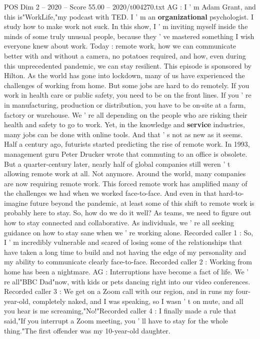 \begin{textsample}{POS Dim 2 – 2020 – Score 55.00 – 2020/t004270.txt}
AG : I ' m Adam Grant, and this is"WorkLife,"my podcast with TED.
I ' m an \textbf{organizational} psychologist.
I study how to make work not suck.
In this show, I ' m inviting myself inside the minds of some truly unusual people, because they ' ve mastered something I wish everyone knew about work.
Today : remote work, how we can communicate better with and without a camera, no potatoes required, and how, even during this unprecedented pandemic, we can stay resilient.
This episode is sponsored by Hilton.
As the world has gone into lockdown, many of us have experienced the challenges of working from home.
But some jobs are hard to do remotely.
If you work in health care or public safety, you need to be on the front lines.
If you ' re in manufacturing, production or distribution, you have to be on-site at a farm, factory or warehouse.
We ' re all depending on the people who are risking their health and safety to go to work.
Yet, in the knowledge and \textbf{service} industries, many jobs can be done with online tools.
And that ' s not as new as it seems.
Half a century ago, futurists started predicting the rise of remote work.
In 1993, management guru Peter Drucker wrote that commuting to an office is obsolete.
But a quarter-century later, nearly half of global companies still weren ' t allowing remote work at all.
Not anymore.
Around the world, many companies are now requiring remote work.
This forced remote work has amplified many of the challenges we had when we worked face-to-face.
And even in that hard-to-imagine future beyond the pandemic, at least some of this shift to remote work is probably here to stay.
So, how do we do it well?
As teams, we need to figure out how to stay connected and collaborative.
As individuals, we ' re all seeking guidance on how to stay sane when we ' re working alone.
Recorded caller 1 : So, I ' m incredibly vulnerable and scared of losing some of the relationships that have taken a long time to build and not having the edge of my personality and my ability to communicate clearly face-to-face.
Recorded caller 2 : Working from home has been a nightmare.
AG : Interruptions have become a fact of life.
We ' re all"BBC Dad"now, with kids or pets dancing right into our video conferences.
Recorded caller 3 : We get on a Zoom call with our region, and in runs my four-year-old, completely naked, and I was speaking, so I wasn ' t on mute, and all you hear is me screaming,"No!"Recorded caller 4 : I finally made a rule that said,"If you interrupt a Zoom meeting, you ' ll have to stay for the whole thing."The first offender was my 10-year-old daughter.

\end{textsample}
